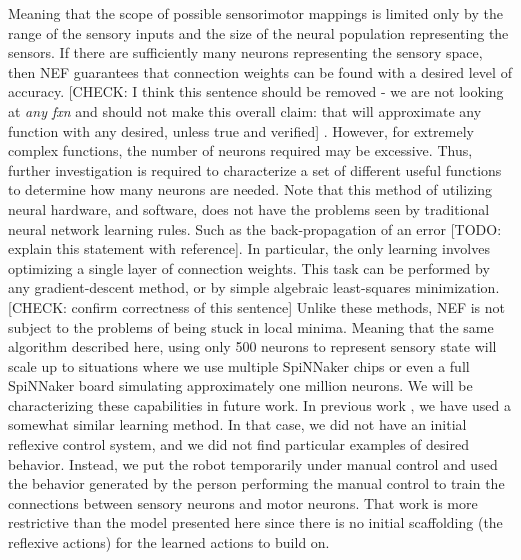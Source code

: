 \documentclass[conference]{IEEEtran}
\begin{document}
Meaning that the scope of possible sensorimotor mappings is limited only by the range of the sensory inputs and the size of the neural population representing the sensors. If there are sufficiently many neurons representing the sensory space, then NEF guarantees that connection weights can be found with a desired level of accuracy. [CHECK: I think this sentence should be removed - we are not looking at \textit{any fxn} and should not make this overall claim: that will approximate any function with any desired, unless true and verified] . However, for extremely complex functions, the number of neurons required may be excessive. Thus, further investigation is required to characterize a set of different useful functions to determine how many neurons are needed. Note that this method of utilizing neural hardware, and software, does not have the problems seen by traditional neural network learning rules. Such as the back-propagation of an error [TODO: explain this statement with reference]. In particular, the only learning involves optimizing a single layer of connection weights. This task can be performed by any gradient-descent method, or by simple algebraic least-squares minimization. [CHECK: confirm correctness of this sentence] Unlike these methods, NEF is not subject to the problems of being stuck in local minima. Meaning that the same algorithm described here, using only 500 neurons to represent sensory state will scale up to situations where we use multiple SpiNNaker chips or even a full SpiNNaker board simulating approximately one million neurons. We will be characterizing these capabilities in future work. In previous work \cite{conradt2014trainable}, we have used a somewhat similar learning method. In that case, we did not have an initial reflexive control system, and we did not find particular examples of desired behavior. Instead, we put the robot temporarily under manual control and used the behavior generated by the person performing the manual control to train the connections between sensory neurons and motor neurons. That work is more restrictive than the model presented here since there is no initial scaffolding (the reflexive actions) for the learned actions to build on.
\end{document}
